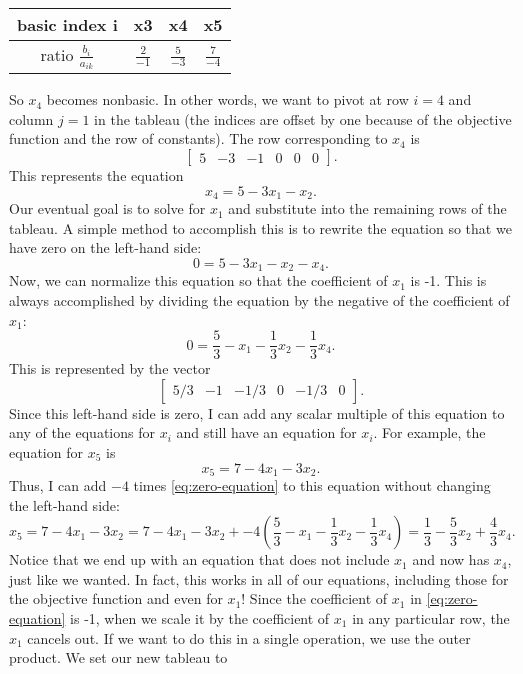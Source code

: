 \begin{table}[h]
\centering
\begin{tabular}{c|c|c|c}
basic index i & x3 & x4 & x5\\
\hline
ratio $\frac{b_i}{a_{ik}}$ & $\frac{2}{-1}$&$ \frac{5}{-3}$ &$ \frac{7}{-4}$\\
\end{tabular}
\end{table}
So $x_4$ becomes nonbasic. In other words, we want to pivot at row $i = 4$ and column $j = 1$ in the tableau (the indices are offset by one because of the objective function and the row of constants). The row corresponding to $x_4$ is
\[
\begin{bmatrix} 5 &-3 &-1 & 0 & 0 & 0\end{bmatrix}.
\]
This represents the equation
\[
	x_4 = 5 - 3x_1 - x_2.
\]
Our eventual goal is to solve for $x_1$ and substitute into the remaining rows of the tableau. A simple method to accomplish this is to rewrite the equation so that we have zero on the left-hand side:
\[
	0 = 5 - 3x_1 - x_2 - x_4.
\]
Now, we can normalize this equation so that the coefficient of $x_1$ is -1. This is always accomplished by dividing the equation by the negative of the coefficient of $x_1$:
\begin{equation}\label{eq:zero-equation}
	0 = \frac{5}{3} - x_1 - \frac{1}{3}x_2 - \frac{1}{3}x_4.
\end{equation}
This is represented by the vector
\[
	\begin{bmatrix} 5/3 & -1 & -1/3 & 0 & -1/3 & 0\end{bmatrix}.
\]
Since this left-hand side is zero, I can add any scalar multiple of this equation to any of the equations for $x_i$ and still have an equation for $x_i$. For example, the equation for $x_5$ is
\[
	x_5 = 7 - 4x_1 - 3x_2.
\]
Thus, I can add $-4$ times \eqref{eq:zero-equation} to this equation without changing the left-hand side:
\[ x_5 = 7 - 4x_1 - 3x_2 = 7 - 4x_1 - 3x_2 + -4\left(\frac{5}{3} - x_1 - \frac{1}{3}x_2 - \frac{1}{3}x_4\right) = \frac{1}{3} - \frac{5}{3}x_2 + \frac{4}{3} x_4.
\]
Notice that we end up with an equation that does not include $x_1$ and now has $x_4$, just like we wanted. In fact, this works in all of our equations, including those for the objective function and even for $x_1$! Since the coefficient of $x_1$ in \eqref{eq:zero-equation} is -1, when we scale it by the coefficient of $x_1$ in any particular row, the $x_1$ cancels out. If we want to do this in a single operation, we use the outer product. We set our new tableau to
